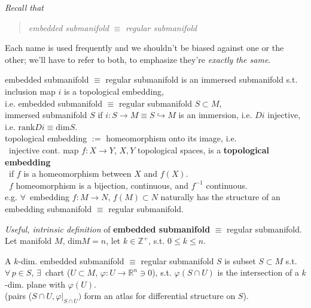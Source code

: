 \documentclass[10pt]{amsart}
\begin{document}
\begin{multicols*}{2}
	

\emph{Recall that} 
\begin{quote}
	\emph{embedded submanifold} $\equiv $ \emph{regular submanifold}
\end{quote}
Each name is used frequently and we shouldn't be biased against one or the other; we'll have to refer to both, to emphasize they're \emph{exactly the same}.

embedded submanifold $\equiv $ regular submanifold is an immersed submanifold s.t. inclusion map $i$ is a topological embedding, \\
i.e. embedded submanifold $\equiv $ regular submanifold $S \subset M$,  \\
immersed submanifold $S$ if $i:S \to M \equiv S \hookrightarrow M$ is an immersion, i.e. $Di$ injective, i.e. $\text{rank}Di \equiv \text{dim}S$. \\
topological embedding $:=$ homeomorphism onto its image, i.e. \\
\qquad \, injective cont. map $f:X \to Y$, $X, Y$ topological spaces, is a \textbf{topological embedding} \\
\qquad \qquad \, if $f$ is a homeomorphism between $X$ and $f(X)$.  \\
\qquad \qquad \qquad \, $f$ homeomorphism is a bijection, continuous, and $f^{-1}$ continuous. \\

e.g. $\forall \, $ embedding $f: M \to N$, $f(M) \subset N$ naturally has the structure of an embedding submanifold $\equiv $ regular submanifold.

\emph{Useful, intrinsic definition} of \textbf{embedded submanifold} $\equiv$ regular submanifold. \\
Let manifold $M$, $\text{dim}M = n$, let $k \in \mathbb{Z}^+$, s.t. $0\leq k \leq n$.

A $k$-dim. embedded submanifold $\equiv $ regular submanifold $S$ is subset $S \subset M$ s.t. $\forall \, p \in S$, $\exists \, $ chart ($U\subset M, \, \varphi : U \to \mathbb{R}^n \ni 0$), s.t. $\varphi(S \cap U)$ is the intersection of a $k$-dim. plane with $\varphi(U)$.  \\
 (pairs ($S\cap U, \left. \varphi \right|_{S \cap U})$ form an atlas for differential structure on $S$).


\end{multicols*}
\end{document}
